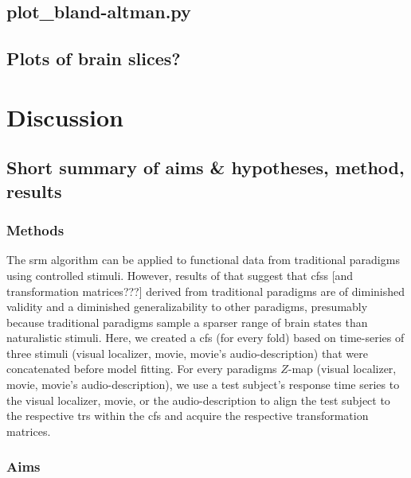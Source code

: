 \subsection{plot\_bland-altman.py}



\subsection{Plots of brain slices?}






\section{Discussion}

\subsection{Short summary of aims \& hypotheses, method, results}



\subsubsection{Methods}

The \ac{srm} algorithm can be applied to functional data from traditional
paradigms using controlled stimuli.
%
However, results of \citet{haxby2011common} that suggest that \acp{cfs} [and
transformation matrices???] derived from traditional paradigms are of diminished
validity and a diminished generalizability to other paradigms, presumably
because traditional paradigms sample a sparser range of brain states than
naturalistic stimuli.
%
Here, we created a \ac{cfs} (for every fold) based on time-series of three
stimuli (visual localizer, movie, movie's audio-description) that were
concatenated before model fitting.
%
For every paradigms $Z$-map (visual localizer, movie, movie's
audio-description), we use a test subject's response time series to the visual
localizer, movie, or the audio-description to align the test subject to the
respective \acp{tr} within the \ac{cfs} and acquire the respective
transformation matrices.


\subsubsection{Aims}

